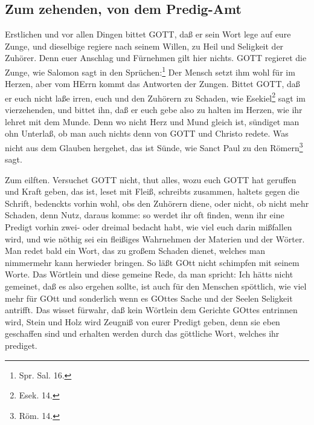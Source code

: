\subsection{Zum zehenden, von dem Predig-Amt}
%

Erstlichen und vor allen Dingen bittet GOTT, daß er sein Wort lege auf eure Zunge, und dieselbige regiere nach seinem Willen, zu Heil und Seligkeit der Zuhörer. Denn euer Anschlag und Fürnehmen gilt hier nichts. GOTT regieret die Zunge, wie Salomon sagt in den Sprüchen:\footnote{Spr. Sal. 16.} Der Mensch setzt ihm wohl für im Herzen, aber vom HErrn kommt das Antworten der Zungen. Bittet GOTT, daß er euch nicht laße irren, euch und den Zuhörern zu Schaden, wie Esekiel\footnote{Esek. 14.} sagt im vierzehenden, und bittet ihn, daß er euch gebe also zu halten im Herzen, wie ihr lehret mit dem Munde. Denn wo nicht Herz und Mund gleich ist, sündiget man ohn Unterlaß, ob man auch nichts denn von GOTT und Christo redete. Was nicht aus dem Glauben hergehet, das ist Sünde, wie Sanct Paul zu den Römern\footnote{Röm. 14.} sagt.

Zum eilften. Versuchet GOTT nicht, thut alles, wozu euch GOTT hat geruffen und Kraft geben, das ist, leset mit Fleiß, schreibts zusammen, haltets gegen die Schrift, bedenckts vorhin wohl, obs den Zuhörern diene, oder
nicht, ob nicht mehr Schaden, denn Nutz, daraus komme: so werdet ihr oft finden, wenn ihr eine Predigt vorhin zwei- oder dreimal bedacht habt, wie viel euch darin mißfallen wird, und wie nöthig sei ein fleißiges Wahrnehmen der Materien und der Wörter. Man redet bald ein Wort, das zu großem Schaden dienet, welches man nimmermehr kann herwieder bringen. So läßt GOtt nicht schimpfen mit seinem Worte. Das Wörtlein und diese gemeine Rede, da man spricht: Ich hätts nicht gemeinet, daß es also ergehen sollte, ist auch für den Menschen spöttlich, wie viel mehr für GOtt und sonderlich wenn es GOttes Sache und der Seelen Seligkeit antrifft. Das wisset fürwahr, daß kein Wörtlein dem Gerichte GOttes entrinnen wird, Stein und Holz wird Zeugniß von eurer Predigt geben, denn sie eben geschaffen sind und erhalten werden durch das göttliche Wort, welches ihr prediget.

